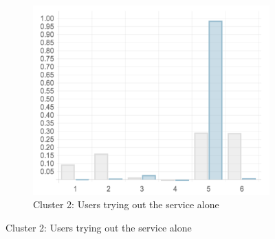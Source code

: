 \begin{figure}
\begin{subfigure}[t]{0.45\textwidth}
    \includegraphics[width=\textwidth]{Figures/clusterings/confluence-post/cluster2-chart}
    \caption{Cluster 2: Users trying out the service alone}
    \label{fig:cluster2-chart}
  \end{subfigure}


\end{figure}

